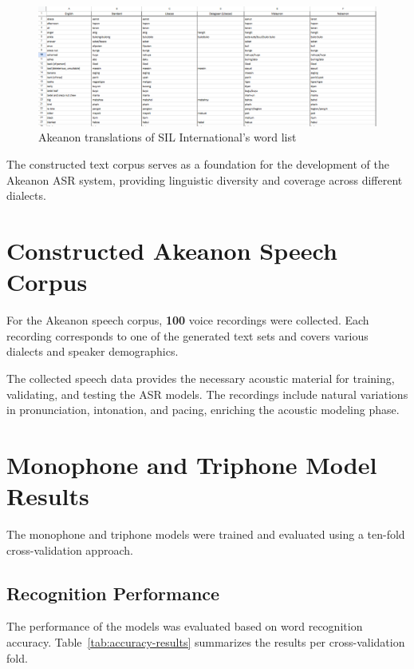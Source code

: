 \begin{figure}[H]
    \centering
    \includegraphics[width=\textwidth]{./figures/SIL.png}
    \caption{Akeanon translations of SIL International's word list}
    \label{fig:sil-list}
\end{figure}

The constructed text corpus serves as a foundation for the development of the Akeanon ASR system, providing linguistic diversity and coverage across different dialects.

\section{Constructed Akeanon Speech Corpus}

For the Akeanon speech corpus, \textbf{100} voice recordings were collected. Each recording corresponds to one of the generated text sets and covers various dialects and speaker demographics.

The collected speech data provides the necessary acoustic material for training, validating, and testing the ASR models. The recordings include natural variations in pronunciation, intonation, and pacing, enriching the acoustic modeling phase.

\section{Monophone and Triphone Model Results}

The monophone and triphone models were trained and evaluated using a ten-fold cross-validation approach.

\subsection{Recognition Performance}

The performance of the models was evaluated based on word recognition accuracy. Table~\ref{tab:accuracy-results} summarizes the results per cross-validation fold.

